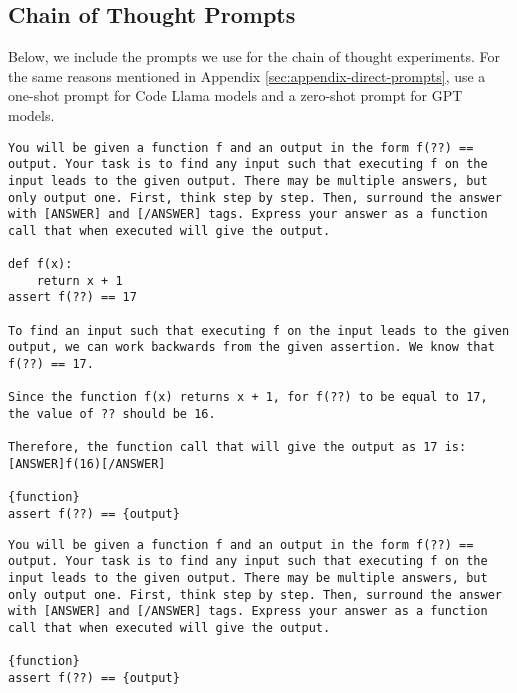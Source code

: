 \subsection{Chain of Thought Prompts}\label{sec:appendix-cot-prompts}
Below, we include the prompts we use for the chain of thought experiments. For the same reasons mentioned in Appendix \ref{sec:appendix-direct-prompts}, use a one-shot prompt for Code Llama models and a zero-shot prompt for GPT models. 

\begin{lstlisting}[caption={CoT input prediction prompt (Code Llama)},label={lst:benchmark-cot-input-prompt-llama}, captionpos=t, breaklines=true]
You will be given a function f and an output in the form f(??) == output. Your task is to find any input such that executing f on the input leads to the given output. There may be multiple answers, but only output one. First, think step by step. Then, surround the answer with [ANSWER] and [/ANSWER] tags. Express your answer as a function call that when executed will give the output.

def f(x):
    return x + 1
assert f(??) == 17

To find an input such that executing f on the input leads to the given output, we can work backwards from the given assertion. We know that f(??) == 17. 

Since the function f(x) returns x + 1, for f(??) to be equal to 17, the value of ?? should be 16. 

Therefore, the function call that will give the output as 17 is:
[ANSWER]f(16)[/ANSWER]    

{function}
assert f(??) == {output}
\end{lstlisting}

\begin{lstlisting}[caption={CoT input prediction prompt (GPT)},label={lst:benchmark-cot-input-prompt-gpt}, captionpos=t, breaklines=true]
You will be given a function f and an output in the form f(??) == output. Your task is to find any input such that executing f on the input leads to the given output. There may be multiple answers, but only output one. First, think step by step. Then, surround the answer with [ANSWER] and [/ANSWER] tags. Express your answer as a function call that when executed will give the output.

{function}
assert f(??) == {output}
\end{lstlisting}


